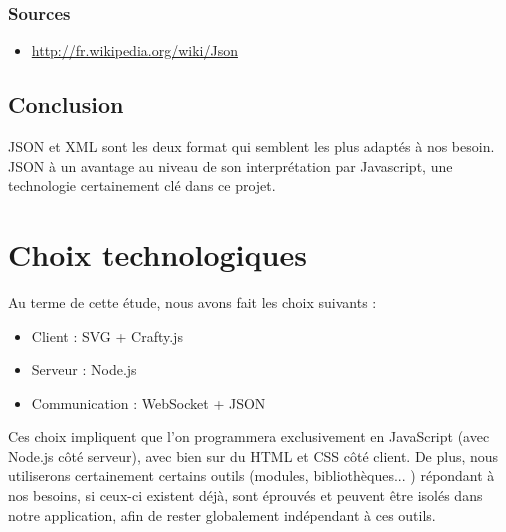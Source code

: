 \documentclass[a4paper,10pt]{report}
\begin{document}
    \subsection{Sources}

\begin{itemize}
 \item \url{http://fr.wikipedia.org/wiki/Json}
\end{itemize}

  \section{Conclusion}

JSON et XML sont les deux format qui semblent les plus adaptés à nos besoin. 
JSON à un avantage au niveau de son interprétation par Javascript, une 
technologie certainement clé dans ce projet.

\chapter{Choix technologiques}

  Au terme de cette étude, nous avons fait les choix suivants : 

  \begin{itemize}
   \item Client : SVG + Crafty.js
   \item Serveur : Node.js
   \item Communication : WebSocket + JSON
  \end{itemize}

  Ces choix impliquent que l'on programmera exclusivement en JavaScript (avec Node.js côté serveur), avec bien sur du HTML et CSS côté client. De plus, nous utiliserons certainement certains outils (modules, bibliothèques... ) répondant à nos besoins, si ceux-ci existent déjà, sont éprouvés et peuvent être isolés dans notre application, afin de rester globalement indépendant à ces outils. 
\end{document}
